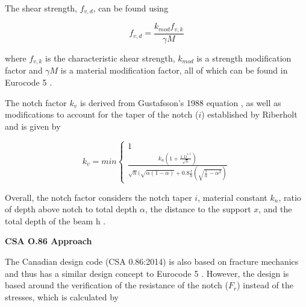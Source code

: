 \documentclass[11pt,a4paper]{article}
\numberwithin{equation}{subsection}
\begin{document}
     \vspace*{\baselineskip} 
     
     \noindent
     The shear strength, $ f_{v,d} $, can be found using
     
   	\begin{equation}
   	f_{v,d} = \dfrac{k_{mod} f_{v,k}}{\gamma M} 
   	\end{equation} 
     
     \noindent
     where $f_{v,k}$ is the characteristic shear strength, $k_{mod}$ is a strength modification factor and $\gamma M$ is a material modification factor, all of which can be found in Eurocode 5 \cite{_eurocode_1995}.
     
     \vspace*{\baselineskip} 
     
     \noindent
     The notch factor $k_{v}$ is derived from Gustafsson's 1988 equation \cite{gustafsson_study_1988}, as well as modifications to account for the taper of the notch ($i$) established by Riberholt \cite{riberholt_timber_1991} and is given by
     
     \begin{equation}
     k_{v} = min
     \begin{cases}
	 1  \\ 
	 \frac{k_{n}(1+\frac{1.1i^{1.5}}{\sqrt{h}})}{\sqrt{h}(\sqrt{\alpha(1-\alpha)} + 0.8\frac{x}{h} (\sqrt{\frac{1}{\alpha}-\alpha^{2}})}
    \end{cases}
    \end{equation}
	
	\vspace*{\baselineskip}
	
	\noindent
	Overall, the notch factor considers the notch taper $i$, material constant $k_{n}$, ratio of depth above notch to total depth $\alpha$, the distance to the support $x$, and the total depth of the beam h \cite{_timber_2005,jockwer_structural_2014}.
	
	\vspace*{\baselineskip} 
	
	\noindent
	\textbf{CSA O.86 Approach}\par
	
	\noindent
     The Canadian design code (CSA 0.86:2014) is also based on fracture mechanics and thus has a similar design concept to Eurocode 5 \cite{jockwer_structural_2014}. However, the design is based around the verification of the resistance of the notch ($F_{r}$) instead of the stresses, which is calculated by
     
\end{document}

